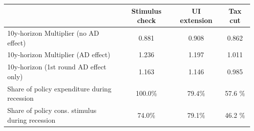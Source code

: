 \begin{tabular}{@{}lccc@{}} 
\toprule 
& Stimulus check    & UI extension    & Tax cut     \\  \midrule 
10y-horizon Multiplier (no AD effect) &0.881  & 0.908  & 0.862     \\ 
10y-horizon Multiplier (AD effect) &1.236  & 1.197  & 1.011     \\ 
10y-horizon (1st round AD effect only) &1.163  & 1.146  & 0.985     \\ 
Share of policy expenditure during recession &100.0\%  & 79.4\%  & 57.6 \%    \\ 
Share of policy cons. stimulus during recession &74.0\%  & 79.1\%  & 46.2 \%    \\ \bottomrule 
\end{tabular}  
